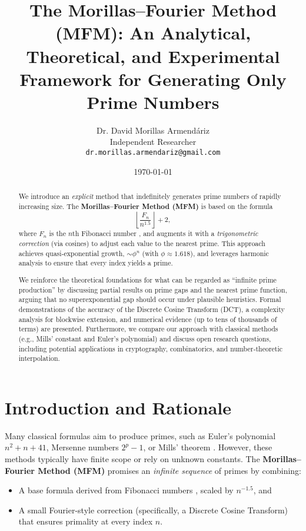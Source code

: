 \documentclass[12pt]{article}
\title{\textbf{The Morillas--Fourier Method (MFM): An Analytical, Theoretical, and Experimental Framework for Generating Only Prime Numbers}}
\author{Dr. David Morillas Armend\'{a}riz \\ \small{Independent Researcher} \\ \small{\texttt{dr.morillas.armendariz@gmail.com}}}
\date{\today}
\begin{document}
\maketitle

\begin{abstract}
We introduce an \emph{explicit} method that indefinitely generates prime numbers of rapidly increasing size. The \textbf{Morillas--Fourier Method (MFM)} is based on the formula
\[
   \left\lfloor \frac{F_n}{n^{1.5}} \right\rfloor + 2,
\]
where $F_n$ is the $n$th Fibonacci number \cite{Koshy}, and augments it with a \emph{trigonometric correction} (via cosines) to adjust each value to the nearest prime. This approach achieves quasi‐exponential growth, $\sim \phi^n$ (with $\phi\approx1.618$), and leverages harmonic analysis \cite{AhmedNatarajanRao,RaoYip} to ensure that every index yields a prime.

We reinforce the theoretical foundations for what can be regarded as “infinite prime production” by discussing partial results on prime gaps \cite{BakerHarmanPintz,Ford2020,Maynard,Maynard2021,TaoPolymath,Zhang} and the nearest prime function, arguing that no superexponential gap should occur under plausible heuristics. Formal demonstrations of the accuracy of the Discrete Cosine Transform (DCT), a complexity analysis for blockwise extension, and numerical evidence (up to tens of thousands of terms) are presented. Furthermore, we compare our approach with classical methods (e.g., Mills’ constant and Euler’s polynomial) and discuss open research questions, including potential applications in cryptography, combinatorics, and number‐theoretic interpolation.
\end{abstract}

\newtheorem{theorem}{Theorem}
\newtheorem{lemma}{Lemma}
\newtheorem{remark}{Remark}

\section{Introduction and Rationale}

Many classical formulas aim to produce primes, such as Euler’s polynomial $n^2+n+41$, Mersenne numbers $2^p-1$, or Mills’ theorem \cite{Mills}. However, these methods typically have finite scope or rely on unknown constants. The \textbf{Morillas--Fourier Method (MFM)} promises an \emph{infinite sequence} of primes by combining:
\begin{itemize}
    \item A base formula derived from Fibonacci numbers \cite{Koshy}, scaled by $n^{-1.5}$, and
    \item A small Fourier-style correction (specifically, a Discrete Cosine Transform) that ensures primality at every index $n$.
\end{itemize}
\end{document}
